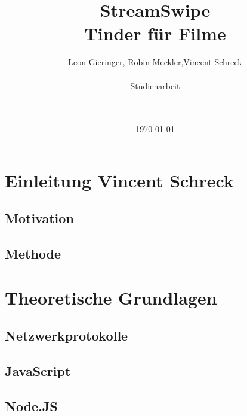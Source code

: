 \documentclass[11pt,a4paper]{article}
\title{StreamSwipe\\Tinder für Filme\vspace{10px}}
\author{Leon Gieringer, Robin Meckler,Vincent Schreck \\ \\ Studienarbeit \\ \\ \\}
\date{\today}
\begin{document}
\maketitle
\thispagestyle{empty}
\newpage
{}
\tableofcontents
\newpage
\listoffigures
\newpage
\lstlistoflistings
\newpage
{}



\pagestyle{fancy}
\fancyhf{}
\setlength{\headheight}{35pt}

\renewcommand\headrulewidth{0.4pt}

\fancyhead[LE,RO]{\rightmark}%
\renewcommand{\sectionmark}[1]{\markright{#1}}
\renewcommand{\subsectionmark}[1]{\markright{#1}}
\renewcommand{\subsubsectionmark}[1]{\markright{#1}}

\cfoot{\thepage}
\newpage


\section[Einleitung]{Einleitung \hfill \normalfont \small{Vincent Schreck}}


\subsection{Motivation}


\subsection{Methode}


\newpage
\section{Theoretische Grundlagen}
\subsection{Netzwerkprotokolle}

\newpage
\subsection{JavaScript}

\newpage
%
\subsection{Node.JS}

%
\end{document}
